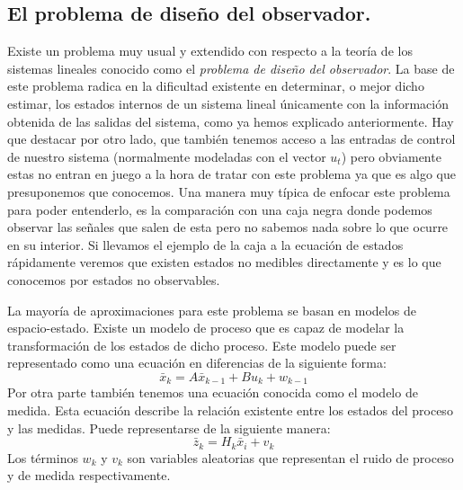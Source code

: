 \subsection{El problema de diseño del observador.}
%
%
%
%
%
%
%

Existe un problema muy usual y extendido con respecto a la teoría de los sistemas lineales conocido como el \textit{problema de diseño del observador}. 
La base de este problema radica en la dificultad existente en determinar, o mejor dicho estimar, los estados internos de un sistema lineal únicamente con la información obtenida de las salidas del sistema, como ya hemos explicado anteriormente. 
Hay que destacar por otro lado, que también tenemos acceso a las entradas de control de nuestro sistema (normalmente modeladas con el vector $u_{t}$) pero obviamente estas no entran en juego a la hora de tratar con este problema ya que es algo que presuponemos que conocemos. 
Una manera muy típica de enfocar este problema para poder entenderlo, es la comparación con una caja negra donde podemos observar las señales que salen de esta pero no sabemos nada sobre lo que ocurre en su interior. 
Si llevamos el ejemplo de la caja a la ecuación de estados rápidamente veremos que existen estados no medibles directamente y es lo que conocemos por estados no observables.

La mayoría de aproximaciones para este problema se basan en modelos de espacio-estado. 
Existe un modelo de proceso que es capaz de modelar la transformación de los estados de dicho proceso. 
Este modelo puede ser representado como una ecuación en diferencias de la siguiente forma:
\begin{equation}\label{modelodeproceso}
\bar{x}_{k} = A\bar{x}_{k-1} + B u_{k} + w_{k-1}
\end{equation}
Por otra parte también tenemos una ecuación conocida como el modelo de medida. 
Esta ecuación describe la relación existente entre los estados del proceso y las medidas. 
Puede representarse de la siguiente manera:
\begin{equation}\label{ecuaciondemedidadeproceso}
\bar{z}_{k} = H_{k}\bar{x}_{i} +v_{k}
\end{equation}
Los términos $w_{k}$ y $v_{k}$ son variables aleatorias que representan el ruido de proceso y de medida respectivamente. 

